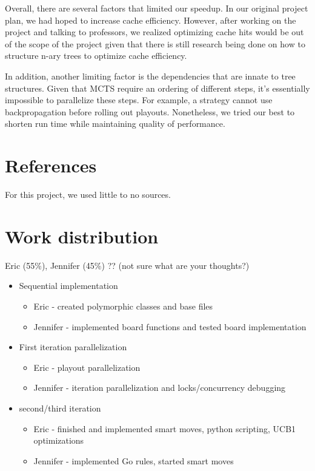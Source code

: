 \documentclass[11pt]{article}
\begin{document}
Overall, there are several factors that limited our speedup. In our original project plan, we had hoped to increase cache efficiency. However, after working on the project and talking to professors, we realized optimizing cache hits would be out of the scope of the project given that there is still research being done on how to structure n-ary trees to optimize cache efficiency. 

In addition, another limiting factor is the dependencies that are innate to tree structures. Given that MCTS require an ordering of different steps, it's essentially impossible to parallelize these steps. For example, a strategy cannot use backpropagation before rolling out playouts. Nonetheless, we tried our best to shorten run time while maintaining quality of performance. 


\section*{References}

For this project, we used little to no sources. 

\section*{Work distribution}
Eric (55\%), Jennifer (45\%) ?? (not sure what are your thoughts?)
\begin{itemize}
\item Sequential implementation
\begin{itemize}
\item Eric - created polymorphic classes and base files
\item Jennifer - implemented board functions and tested board implementation
\end{itemize}

\item First iteration parallelization
\begin{itemize}
\item Eric - playout parallelization
\item Jennifer - iteration parallelization and locks/concurrency debugging
\end{itemize}
\item second/third iteration
\begin{itemize}
\item Eric - finished and implemented smart moves, python scripting, UCB1 optimizations
\item Jennifer - implemented Go rules, started smart moves
\end{itemize}

\end{itemize}
\end{document}
